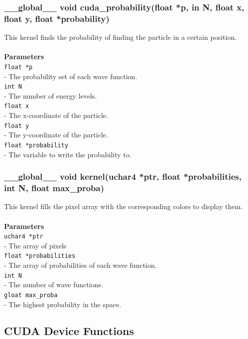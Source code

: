 \documentclass[a4paper, 10pt]{article}
\def\mar{\hspace*{5mm}}
\begin{document}
        \subsubsection{\_\_global\_\_ void cuda\_probability(float *p, in N, float x, float y,
        float *probability)}
        This kernel finds the probability of finding the particle in a certain position.\\
        \\{\bf Parameters}\\
        \verb|float *p|\\\mar- The probability set of each wave function.\\
        \verb|int N|\\\mar- The number of energy levels.\\
        \verb|float x|\\\mar- The x-coordinate of the particle.\\
        \verb|float y|\\\mar- The y-coordinate of the particle.\\
        \verb|float *probability|\\\mar- The variable to write the probability to.

        \vspace{1cm}
        \subsubsection{\_\_global\_\_ void kernel(uchar4 *ptr, float *probabilities, int N,
        float max\_proba)}
        This kernel fills the pixel array with the corresponding colors to display them.\\
        \\{\bf Parameters}\\
        \verb|uchar4 *ptr|\\\mar- The array of pixels\\
        \verb|float *probabilities|\\\mar- The array of probabilities of each wave function.\\
        \verb|int N|\\\mar- The number of wave functions.\\
        \verb|gloat max_proba|\\\mar- The highest probability in the space.

    \newpage
    \subsection{CUDA Device Functions}
        \vspace{1cm}
\end{document}
